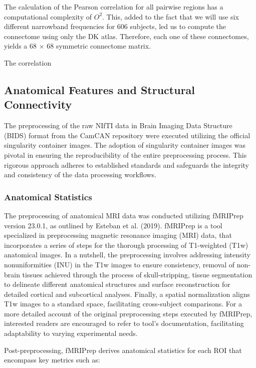 \documentclass{cys}
\begin{document}
\bigskip
The calculation of the Pearson correlation for all pairwise regions has a computational complexity of $O^2$. This, added to the fact that we will use six different narrowband frequencies for 606 subjects, led us to compute the connectome using only the DK atlas. Therefore, each one of these connectomes, yields a 68 $\times$ 68 symmetric connectome matrix.

\bigskip
The correlation 
\subsection{Anatomical Features and Structural Connectivity}

The preprocessing of the raw NIfTI data in Brain Imaging Data Structure (BIDS) format from the CamCAN repository were executed utilizing the official singularity container images. The adoption of singularity container images was pivotal in ensuring the reproducibility of the entire preprocessing process. This rigorous approach adheres to established standards and safeguards the integrity and consistency of the data processing workflows.

\bigskip
\subsubsection{Anatomical Statistics}


The preprocessing of anatomical MRI data was conducted utilizing fMRIPrep version 23.0.1, as outlined by Esteban et al. (2019). fMRIPrep is a tool specialized in preprocessing magnetic resonance imaging (MRI) data, that incorporates a series of steps for the thorough processing of T1-weighted (T1w) anatomical images. In a nutshell, the preprocessing involves addressing intensity nonuniformities (INU) in the T1w images to ensure consistency, removal of non-brain tissues achieved through the process of skull-stripping, tissue segmentation to delineate different anatomical structures and surface reconstruction for detailed cortical and subcortical analyses. Finally, a spatial normalization aligns T1w images to a standard space, facilitating cross-subject comparisons. For a more detailed account of the original preprocessing steps executed by fMRIPrep, interested readers are encouraged to refer to tool's documentation, facilitating adaptability to varying experimental needs.


\bigskip
Post-preprocessing, fMRIPrep derives anatomical statistics for each ROI that encompass key metrics such as:
\end{document}
